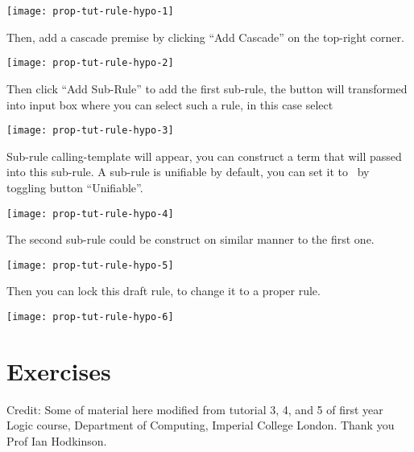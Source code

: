 \documentclass[master.tex]{subfiles}
\begin{document}
\begin{center}
  \texttt{[image: prop-tut-rule-hypo-1]}
\end{center}

Then, add a cascade premise by clicking ``Add Cascade'' on the top-right corner.

\begin{center}
  \texttt{[image: prop-tut-rule-hypo-2]}
\end{center}

Then click ``Add Sub-Rule'' to add the first sub-rule, the button will
transformed into input box where you can select such a rule, in this case select

\begin{center}
  \texttt{[image: prop-tut-rule-hypo-3]}
\end{center}

Sub-rule calling-template will appear, you can construct a term that will passed
into this sub-rule. A sub-rule is unifiable by default, you can set it to
\kExactMatch\ by toggling button ``Unifiable''.

\begin{center}
  \texttt{[image: prop-tut-rule-hypo-4]}
\end{center}

The second sub-rule could be construct on similar manner to the first one.

\begin{center}
  \texttt{[image: prop-tut-rule-hypo-5]}
\end{center}

Then you can lock this draft rule, to change it to a proper rule.

\begin{center}
  \texttt{[image: prop-tut-rule-hypo-6]}
\end{center}

\newpage

\section{Exercises}

Credit: Some of material here modified from tutorial 3, 4, and 5 of first year Logic
course, Department of Computing, Imperial College London. Thank you Prof Ian
Hodkinson.
\end{document}
